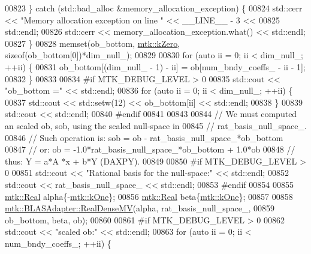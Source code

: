 \begin{DoxyCode}
{{00823     \} \textcolor{keywordflow}{catch} (std::bad\_alloc &memory\_allocation\_exception) \{
00824       std::cerr << \textcolor{stringliteral}{"Memory allocation exception on line "} << \_\_LINE\_\_ - 3 <<
00825         std::endl;
00826       std::cerr << memory\_allocation\_exception.what() << std::endl;
00827     \}
00828     memset(ob\_bottom, \hyperlink{group__c01-roots_ga59a451a5fae30d59649bcda274fea271}{mtk::kZero}, \textcolor{keyword}{sizeof}(ob\_bottom[0])*dim\_null\_);
00829 
00830     \textcolor{keywordflow}{for} (\textcolor{keyword}{auto} ii = 0; ii < dim\_null\_; ++ii) \{
00831       ob\_bottom[(dim\_null\_ - 1) - ii] = ob[num\_bndy\_coeffs\_ - ii - 1];
00832     \}
00833 
00834 \textcolor{preprocessor}{    #if MTK\_DEBUG\_LEVEL > 0}
00835     std::cout << \textcolor{stringliteral}{"ob\_bottom ="} << std::endl;
00836     \textcolor{keywordflow}{for} (\textcolor{keyword}{auto} ii = 0; ii < dim\_null\_; ++ii) \{
00837       std::cout << std::setw(12) << ob\_bottom[ii] << std::endl;
00838     \}
00839     std::cout << std::endl;
00840 \textcolor{preprocessor}{    #endif}
00841 
00843 
00844     \textcolor{comment}{// We must computed an scaled ob, sob, using the scaled null-space in}
00845     \textcolor{comment}{// rat\_basis\_null\_space\_.}
00846     \textcolor{comment}{// Such operation is: sob = ob - rat\_basis\_null\_space\_*ob\_bottom}
00847     \textcolor{comment}{// or:                 ob = -1.0*rat\_basis\_null\_space\_*ob\_bottom + 1.0*ob}
00848     \textcolor{comment}{// thus:                Y =    a*A    *x         +   b*Y (DAXPY).}
00849 
00850 \textcolor{preprocessor}{    #if MTK\_DEBUG\_LEVEL > 0}
00851     std::cout << \textcolor{stringliteral}{"Rational basis for the null-space:"} << std::endl;
00852     std::cout << rat\_basis\_null\_space\_ << std::endl;
00853 \textcolor{preprocessor}{    #endif}
00854 
00855     \hyperlink{group__c01-roots_gac080bbbf5cbb5502c9f00405f894857d}{mtk::Real} alpha\{-\hyperlink{group__c01-roots_ga26407c24d43b6b95480943340d285c71}{mtk::kOne}\};
00856     \hyperlink{group__c01-roots_gac080bbbf5cbb5502c9f00405f894857d}{mtk::Real} beta\{\hyperlink{group__c01-roots_ga26407c24d43b6b95480943340d285c71}{mtk::kOne}\};
00857 
00858     \hyperlink{classmtk_1_1BLASAdapter_afdcac059a4294287cb55638221220646}{mtk::BLASAdapter::RealDenseMV}(alpha, rat\_basis\_null\_space\_,
00859                                   ob\_bottom, beta, ob);
00860 
00861 \textcolor{preprocessor}{    #if MTK\_DEBUG\_LEVEL > 0}
00862     std::cout << \textcolor{stringliteral}{"scaled ob:"} << std::endl;
00863     \textcolor{keywordflow}{for} (\textcolor{keyword}{auto} ii = 0; ii < num\_bndy\_coeffs\_; ++ii) \{
}}
\end{DoxyCode}
